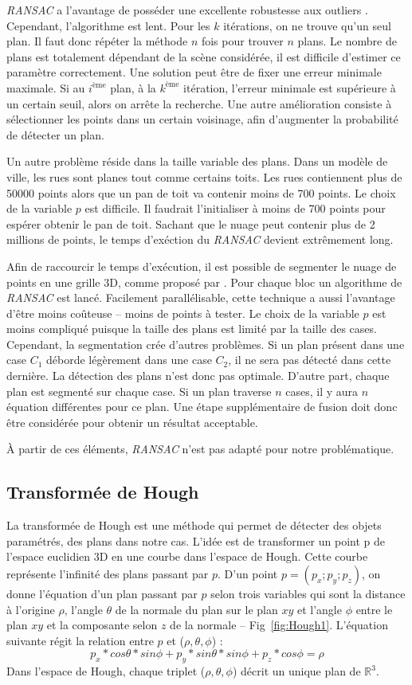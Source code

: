 \documentclass[12pt, twoside]{article}
\begin{document}
\textit{RANSAC} a l’avantage de posséder une excellente robustesse aux outliers \cite{RANSAC1}. Cependant, l’algorithme est lent. Pour les $k$ itérations, on ne trouve qu’un seul plan. Il faut donc répéter la méthode $n$ fois pour trouver $n$ plans. Le nombre de plans est totalement dépendant de la scène considérée, il est difficile d’estimer ce paramètre correctement. Une solution peut être de fixer une erreur minimale maximale. Si au $i^\text{ème}$ plan, à la $k^\text{ème}$ itération, l’erreur minimale est supérieure à un certain seuil, alors on arrête la recherche. Une autre amélioration consiste à sélectionner les points dans un certain voisinage, afin d’augmenter la probabilité de détecter un plan.

Un autre problème réside dans la taille variable des plans. Dans un modèle de ville, les rues sont planes tout comme certains toits. Les rues contiennent plus de 50000 points alors que un pan de toit va contenir moins de 700 points. Le choix de la variable $p$ est difficile. Il faudrait l'initialiser à moins de 700 points pour espérer obtenir le pan de toit. Sachant que le nuage peut contenir plus de 2 millions de points, le temps d'exéction du \textit{RANSAC} devient extrêmement long.

Afin de raccourcir le temps d'exécution, il est possible de segmenter le nuage de points en une grille 3D, comme proposé par \cite{RANSAC2}. Pour chaque bloc un algorithme de \textit{RANSAC} est lancé. Facilement parallélisable, cette technique a aussi l'avantage d'être moins coûteuse -- moins de points à tester. Le choix de la variable $p$ est moins compliqué puisque la taille des plans est limité par la taille des cases. Cependant, la segmentation crée d'autres problèmes. Si un plan présent dans une case $C_1$ déborde légèrement dans une case $C_2$, il ne sera pas détecté dans cette dernière. La détection des plans n'est donc pas optimale. D'autre part, chaque plan est segmenté sur chaque case. Si un plan traverse $n$ cases, il y aura $n$ équation différentes pour ce plan. Une étape supplémentaire de fusion doit donc être considérée pour obtenir un résultat acceptable.

À partir de ces éléments, \textit{RANSAC} n'est pas adapté pour notre problématique.

\subsection{Transformée de Hough}
La transformée de Hough est une méthode qui permet de détecter des objets paramétrés, des plans dans notre cas. L’idée est de transformer un point p de l’espace euclidien 3D en une courbe dans l’espace de Hough. Cette courbe représente l’infinité des plans passant par $p$. D’un point $p = (p_x; p_y; p_z)$, on donne l’équation d’un plan passant par $p$ selon trois variables qui sont la distance à l’origine $\rho$, l’angle $\theta$ de la normale du plan sur le plan $xy$ et l’angle $\phi$ entre le plan $xy$ et la composante selon $z$ de la normale -- Fig~\ref{fig:Hough1}. L’équation suivante régit la relation entre $p$ et ($\rho, \theta, \phi$) :
$$p_x*cos\theta * sin\phi + p_y*sin\theta*sin\phi + p_z*cos\phi = \rho$$
Dans l'espace de Hough, chaque triplet ($\rho, \theta, \phi$) décrit un unique plan de $\mathbb{R}^3$.
\end{document}
